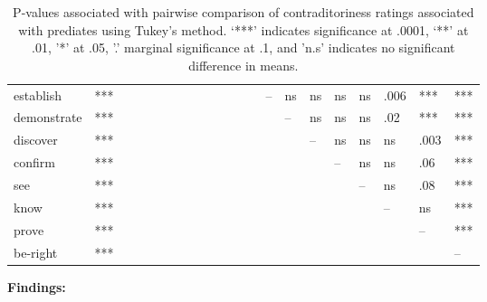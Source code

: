 \documentclass[11pt,fleqn]{article}
\newcommand{\6}{\mbox{$[\hspace*{-.6mm}[$}}
\newcommand{\9}{\mbox{$]\hspace*{-.6mm}]$}}
\begin{document}
\begin{table}[h!]
\begin{center}
\begin{tiny}
\begin{tabular}{l l l l l l l l l l l l l l l l l l l l l }
establish  			&  *** & & & & & & & & & & & & -- & ns & ns & ns & ns & .006 & *** &  ***  \\ 
demonstrate  		&  *** & & & & & & & & & & & & & -- & ns & ns & ns & .02 &  *** & ***  \\ 
discover  			&  *** & & & & & & & & & & & & & & -- & ns & ns & ns & .003 &  *** \\ 
confirm  			&  *** & & & & & & & & & & & & & & & -- & ns &  ns & .06 & ***  \\ 
see  				&  *** & & & & & & & & & & & & & & & & -- & ns & .08 &  ***  \\ 
know 			&  *** & & & & & & & & & & & & & & & & & -- & ns &  ***  \\ 
prove  			&  *** & & & & & & & & & & & & & & & & & & -- &  *** \\ 
be-right  			&  *** & & & & & & & & & & & & & & & & & & & -- \\ 
\bottomrule
\end{tabular}
 \end{tiny}
\caption{P-values associated with pairwise comparison of contraditoriness ratings associated with prediates using Tukey's method. `***' indicates significance at .0001, `**' at .01, '*' at .05, '.' marginal significance at .1, and 'n.s' indicates no significant difference in means.}
\end{center}
\end{table}

{\bf Findings:}
\end{document}
